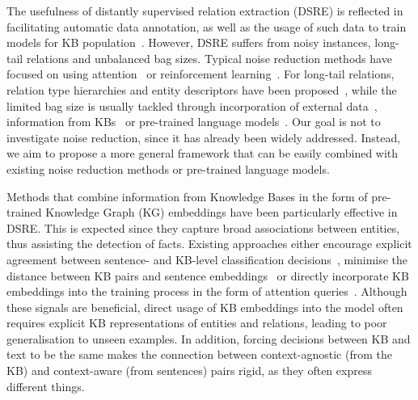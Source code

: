 \documentclass[11pt]{article}
\begin{document}
The usefulness of distantly supervised relation extraction (DSRE) is reflected in facilitating automatic data annotation, as well as the usage of such data to train models for KB population~\citep{ji2011knowledge}. However, DSRE suffers from noisy instances, long-tail relations and unbalanced bag sizes. 
Typical noise reduction methods have focused on using attention~\citep{lin2016neural,ye2019intra-inter} or reinforcement learning~\citep{qin2018robust,wu2019improving}. For long-tail relations, relation type hierarchies and entity descriptors have been proposed~\citep{she2018descriptions,zhang2019long-tail,hu2019improving}, while the limited bag size is usually tackled through incorporation of external data~\citep{beltagy2019distant-direct}, information from KBs~\citep{vashishth2018reside} or pre-trained language models~\citep{alt2019fine}. 
Our goal is not to investigate noise reduction, since it has already been widely addressed. Instead, we aim to propose a more general framework that can be easily combined with existing noise reduction methods or pre-trained language models.

Methods that combine information from Knowledge Bases in the form of pre-trained Knowledge Graph (KG) embeddings have been particularly effective in DSRE. This is expected since they capture broad associations between entities, thus assisting the detection of facts. Existing approaches either encourage explicit agreement between sentence- and KB-level classification decisions~\citep{weston2013connecting,xu2019hrere}, minimise the distance between KB pairs and sentence embeddings~\citep{wang2018label} or directly incorporate KB embeddings into the training process in the form of attention queries~\citep{han2018jointnre,she2018descriptions,hu2019improving}. Although these signals are beneficial, direct usage of KB embeddings into the model often requires explicit KB representations of entities and relations, leading to poor generalisation to unseen examples. In addition, forcing decisions between KB and text to be the same makes the connection between context-agnostic (from the KB) and context-aware (from sentences) pairs rigid, as they often express different things.
\end{document}
